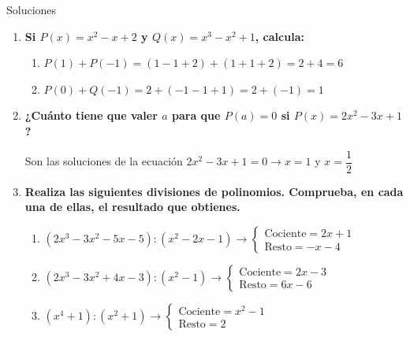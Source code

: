 \documentclass[a4paper,12pt]{article}
\begin{document}
Soluciones

\begin{enumerate}
    \item \textbf{Si $P(x) = x^2 - x + 2$ y $Q(x) = x^3 - x^2 + 1$, calcula:}
    \begin{enumerate}[label=\textbf{\alph*)}]
        \item $P(1) + P(-1) = (1 - 1 + 2) + (1 + 1 + 2) = 2 + 4 = 6$
        \item $P(0) + Q(-1) = 2 + (-1 - 1 + 1) = 2 + (-1) = 1$
    \end{enumerate}

    \vspace{0.5cm}

    \item \textbf{¿Cuánto tiene que valer $a$ para que $P(a) = 0$ si $P(x) = 2x^2 - 3x + 1$?}

    Son las soluciones de la ecuación $2x^2 - 3x + 1 = 0 \to x = 1$ y $x = \dfrac{1}{2}$
    \item \textbf{Realiza las siguientes divisiones de polinomios. Comprueba, en cada una de ellas, el resultado que obtienes.}

        \begin{enumerate}[label=\textbf{\alph*)}]
            \item $(2x^3 - 3x^2 - 5x - 5) : (x^2 - 2x - 1) \longrightarrow \begin{cases} \text{Cociente} = 2x + 1 \\ \text{Resto} = -x - 4 \end{cases}$

            \vspace{0.3cm}

            \item $(2x^3 - 3x^2 + 4x - 3) : (x^2 - 1) \longrightarrow \begin{cases} \text{Cociente} = 2x - 3 \\ \text{Resto} = 6x - 6 \end{cases}$

            \vspace{0.3cm}

            \item $(x^4 + 1) : (x^2 + 1) \longrightarrow \begin{cases} \text{Cociente} = x^2 - 1 \\ \text{Resto} = 2 \end{cases}$

            \vspace{0.3cm}


\end{enumerate}
\end{enumerate}
\end{document}
